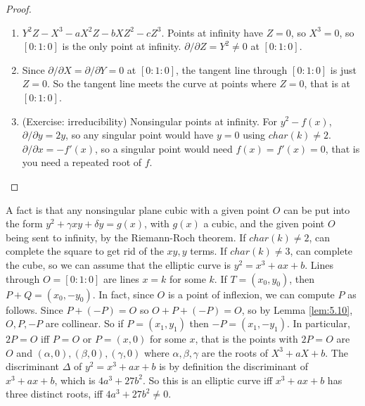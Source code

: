 \documentclass{article}
\newcommand{\rb}[1]{\left( #1 \right)}
\renewcommand{\sb}[1]{\left[ #1 \right]}
\theoremstyle{definition}\newtheorem{definition}{Definition}[section]
\theoremstyle{definition}\newtheorem{remark}[definition]{Remark}
\theoremstyle{definition}\newtheorem*{example}{Example}
\theoremstyle{definition}\newtheorem*{note}{Note}
\begin{document}
\begin{proof}
\hfill
\begin{enumerate}
\item $ Y^2Z - X^3 - aX^2Z - bXZ^2 - cZ^3 $. Points at infinity have $ Z = 0 $, so $ X^3 = 0 $, so $ \sb{0 : 1 : 0} $ is the only point at infinity. $ \partial / \partial Z = Y^2 \ne 0 $ at $ \sb{0 : 1 : 0} $.
\item Since $ \partial / \partial X = \partial / \partial Y = 0 $ at $ \sb{0 : 1 : 0} $, the tangent line through $ \sb{0 : 1 : 0} $ is just $ Z = 0 $. So the tangent line meets the curve at points where $ Z = 0 $, that is at $ \sb{0 : 1 : 0} $.
\item (Exercise: irreducibility) Nonsingular points at infinity. For $ y^2 - f\rb{x} $, $ \partial / \partial y = 2y $, so any singular point would have $ y = 0 $ using $ char\rb{k} \ne 2 $. $ \partial / \partial x = -f'\rb{x} $, so a singular point would need $ f\rb{x} = f'\rb{x} = 0 $, that is you need a repeated root of $ f $.
\end{enumerate}
\end{proof}

A fact is that any nonsingular plane cubic with a given point $ O $ can be put into the form $ y^2 + \gamma xy + \delta y = g\rb{x} $, with $ g\rb{x} $ a cubic, and the given point $ O $ being sent to infinity, by the Riemann-Roch theorem. If $ char\rb{k} \ne 2 $, can complete the square to get rid of the $ xy, y $ terms. If $ char\rb{k} \ne 3 $, can complete the cube, so we can assume that the elliptic curve is $ y^2 = x^3 + ax + b $. Lines through $ O = \sb{0 : 1 : 0} $ are lines $ x = k $ for some $ k $. If $ T = \rb{x_0, y_0} $, then $ P + Q = \rb{x_0, -y_0} $. In fact, since $ O $ is a point of inflexion, we can compute $ P $ as follows. Since $ P + \rb{-P} = O $ so $ O + P + \rb{-P} = O $, so by Lemma \ref{lem:5.10}, $ O, P, -P $ are collinear. So if $ P = \rb{x_1, y_1} $ then $ -P = \rb{x_1, -y_1} $. In particular, $ 2P = O $ iff $ P = O $ or $ P = \rb{x, 0} $ for some $ x $, that is the points with $ 2P = O $ are $ O $ and $ \rb{\alpha, 0}, \rb{\beta, 0}, \rb{\gamma, 0} $ where $ \alpha, \beta, \gamma $ are the roots of $ X^3 + aX + b $. The discriminant $ \Delta $ of $ y^2 = x^3 + ax + b $ is by definition the discriminant of $ x^3 + ax + b $, which is $ 4a^3 + 27b^2 $. So this is an elliptic curve iff $ x^3 + ax + b $ has three distinct roots, iff $ 4a^3 + 27b^2 \ne 0 $.

\end{document}

